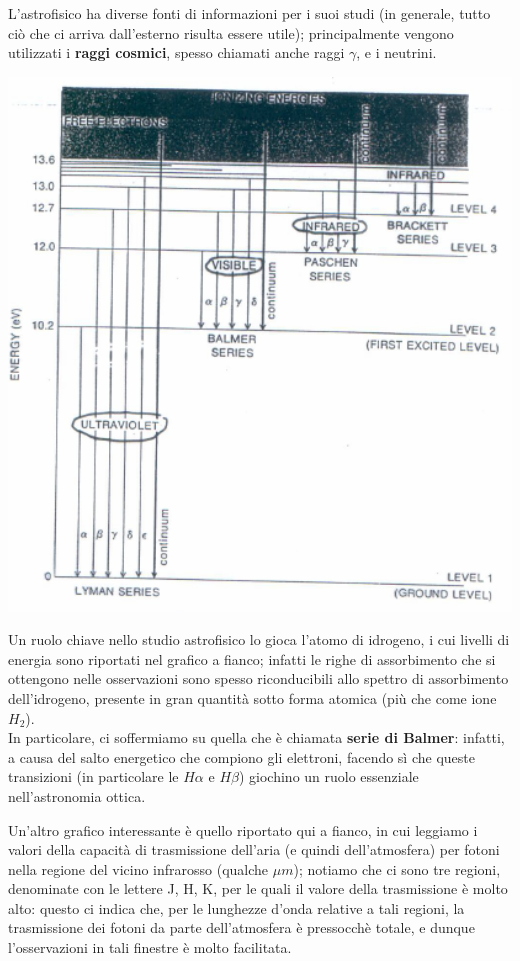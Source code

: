 L'astrofisico ha diverse fonti di informazioni per i suoi studi (in generale, tutto ciò che ci arriva dall'esterno risulta essere utile); principalmente vengono utilizzati i \textbf{raggi cosmici}, spesso chiamati anche raggi $\gamma$, e i neutrini.
\vspace{0.2cm}
\begin{minipage}{.50\textwidth}
	\centering
	\includegraphics[width=1\textwidth]{Img/bertin_3.png}
\end{minipage}
\begin{minipage}{.50\textwidth}
	Un ruolo chiave nello studio astrofisico lo gioca l'atomo di idrogeno, i cui livelli di energia sono riportati nel grafico a fianco; infatti le righe di assorbimento che si ottengono nelle osservazioni sono spesso riconducibili allo spettro di assorbimento dell'idrogeno, presente in gran quantità sotto forma atomica (più che come ione $H_2$).\\
	In particolare, ci soffermiamo su quella che è chiamata \textbf{serie di Balmer}: infatti, a causa del salto energetico che compiono gli elettroni, facendo sì che queste transizioni (in particolare le $H \alpha$ e $H \beta$) giochino un ruolo essenziale nell'astronomia ottica.
\end{minipage}
\clearpage
\begin{minipage}{.45\textwidth}
Un'altro grafico interessante è quello riportato qui a fianco, in cui leggiamo i valori della capacità di trasmissione dell'aria (e quindi dell'atmosfera) per fotoni nella regione del vicino infrarosso (qualche $\mu m$); notiamo che ci sono tre regioni, denominate con le lettere J, H, K, per le quali il valore della trasmissione è molto alto: questo ci indica che, per le lunghezze d'onda relative a tali regioni, la trasmissione dei fotoni da parte dell'atmosfera è pressocchè totale, e dunque l'osservazioni in tali finestre è molto facilitata.
\end{minipage}
